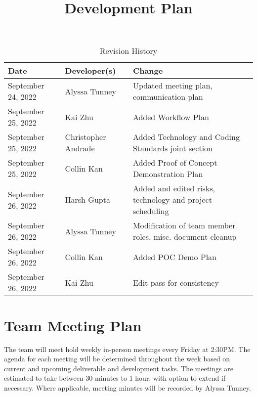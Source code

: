 \documentclass{article}
\title{Development Plan\\\progname}
\author{\authname}
\date{}
\begin{document}
\maketitle


\newpage

\begin{table}[hp]
	\caption{Revision History} \label{TblRevisionHistory}
	\begin{tabularx}{\textwidth}{llX}
		\toprule
		\textbf{Date}      & \textbf{Developer(s)} & \textbf{Change}                                           \\
		\midrule
		September 24, 2022 & Alyssa Tunney         & Updated meeting plan, communication plan                  \\
		September 25, 2022 & Kai Zhu               & Added Workflow Plan                                       \\
		September 25, 2022 & Christopher Andrade   & Added Technology and Coding Standards joint section       \\
		September 25, 2022 & Collin Kan            & Added Proof of Concept Demonstration Plan                 \\
		September 26, 2022 & Harsh Gupta           & Added and edited risks, technology and project scheduling \\
		September 26, 2022 & Alyssa Tunney         & Modification of team member roles, misc. document cleanup \\
		September 26, 2022 & Collin Kan            & Added POC Demo Plan                                       \\
		September 26, 2022 & Kai Zhu               & Edit pass for consistency                                 \\
		\bottomrule
	\end{tabularx}
\end{table}

\newpage
\section{Team Meeting Plan}

The team will meet hold weekly in-person meetings every Friday at 2:30PM. The
agenda for each meeting will be determined  throughout the week based on
current and upcoming deliverable and development tasks. The meetings are
estimated to take between 30 minutes to 1 hour, with option to extend if
necessary. Where applicable, meeting minutes will be recorded by Alyssa Tunney.
\end{document}

